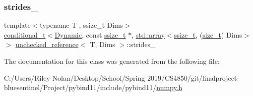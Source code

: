 \mbox{\label{classunchecked__reference_a2c0c345a2c143eda073394a8fe8f59f9}} 
\subsubsection{\texorpdfstring{strides\_}{strides\_}}
{\footnotesize\ttfamily template$<$typename T , ssize\+\_\+t Dims$>$ \\
\mbox{\hyperlink{detail_2common_8h_acdb0eff728aec08ed6fff07d2885ea9d}{conditional\+\_\+t}}$<$\mbox{\hyperlink{classunchecked__reference_a4ad5525b6ab61ac1c5536df0249901b3}{Dynamic}}, const \mbox{\hyperlink{detail_2common_8h_ac430d16fc097b3bf0a7469cfd09decda}{ssize\+\_\+t}} $\ast$, \mbox{\hyperlink{_s_d_l__opengl__glext_8h_a52f38e7d822a46377fde7a02708eedb1}{std\+::array}}$<$\mbox{\hyperlink{detail_2common_8h_ac430d16fc097b3bf0a7469cfd09decda}{ssize\+\_\+t}}, (\mbox{\hyperlink{detail_2common_8h_a801d6a451a01953ef8cbae6feb6a3638}{size\+\_\+t}}) Dims$>$ $>$ \mbox{\hyperlink{classunchecked__reference}{unchecked\+\_\+reference}}$<$ T, Dims $>$\+::strides\+\_\+\hspace{0.3cm}{\ttfamily [protected]}}



The documentation for this class was generated from the following file\+:\begin{DoxyCompactItemize}
\item 
C\+:/\+Users/\+Riley Nolan/\+Desktop/\+School/\+Spring 2019/\+C\+S4850/git/finalproject-\/bluesentinel/\+Project/pybind11/include/pybind11/\mbox{\hyperlink{numpy_8h}{numpy.\+h}}\end{DoxyCompactItemize}
